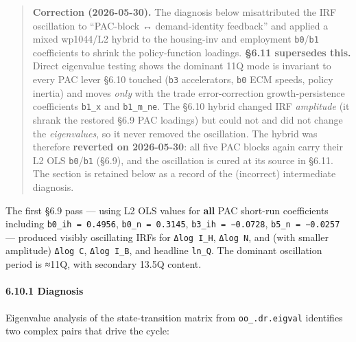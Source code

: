 \documentclass[
]{article}
\begin{document}
\begin{quote}
\textbf{Correction (2026-05-30).} The diagnosis below misattributed the
IRF oscillation to ``PAC-block ↔ demand-identity feedback'' and applied
a mixed wp1044/L2 hybrid to the housing-inv and employment
\texttt{b0}/\texttt{b1} coefficients to shrink the policy-function
loadings. \textbf{§6.11 supersedes this.} Direct eigenvalue testing
shows the dominant 11Q mode is invariant to every PAC lever §6.10
touched (\texttt{b3} accelerators, \texttt{b0} ECM speeds, policy
inertia) and moves \emph{only} with the trade error-correction
growth-persistence coefficients \texttt{b1\_x} and \texttt{b1\_m\_ne}.
The §6.10 hybrid changed IRF \emph{amplitude} (it shrank the restored
§6.9 PAC loadings) but could not and did not change the
\emph{eigenvalues}, so it never removed the oscillation. The hybrid was
therefore \textbf{reverted on 2026-05-30}: all five PAC blocks again
carry their L2 OLS \texttt{b0}/\texttt{b1} (§6.9), and the oscillation
is cured at its source in §6.11. The section is retained below as a
record of the (incorrect) intermediate diagnosis.
\end{quote}

The first §6.9 pass --- using L2 OLS values for \textbf{all} PAC
short-run coefficients including \texttt{b0\_ih\ =\ 0.4956},
\texttt{b0\_n\ =\ 0.3145}, \texttt{b3\_ih\ =\ −0.0728},
\texttt{b5\_n\ =\ −0.0257} --- produced visibly oscillating IRFs for
\texttt{Δlog\ I\_H}, \texttt{Δlog\ N}, and (with smaller amplitude)
\texttt{Δlog\ C}, \texttt{Δlog\ I\_B}, and headline \texttt{ln\_Q}. The
dominant oscillation period is ≈11Q, with secondary 13.5Q content.

\paragraph{6.10.1 Diagnosis}\label{diagnosis}

Eigenvalue analysis of the state-transition matrix from
\texttt{oo\_.dr.eigval} identifies two complex pairs that drive the
cycle:
\end{document}

